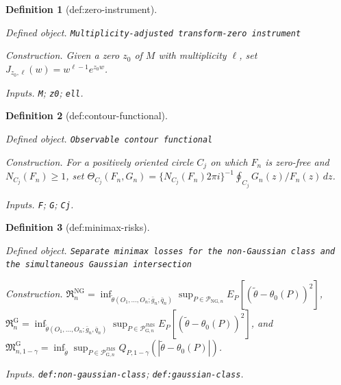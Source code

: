 \documentclass{article}
\newtheorem{definition}{Definition}
\begin{document}
\begin{definition}[def:zero-instrument]\label{def:zero-instrument}
\par\smallskip\noindent\emph{Defined object.} \texttt{Multiplicity-\allowbreak{}adjusted transform-\allowbreak{}zero instrument}
\par\smallskip\noindent\emph{Construction.} Given a zero \(z_0\) of \(M\) with multiplicity \(\ell\), set \(J_{z_0,\ell}(w)=w^{\ell-1}e^{z_0w}\).
\par\smallskip\noindent\emph{Inputs.} \texttt{M}; \texttt{z0}; \texttt{ell}.
\end{definition}

\begin{definition}[def:contour-functional]\label{def:contour-functional}
\par\smallskip\noindent\emph{Defined object.} \texttt{Observable contour functional}
\par\smallskip\noindent\emph{Construction.} For a positively oriented circle \(C_j\) on which \(F_n\) is zero-free and \(N_{C_j}(F_n)\ge1\), set \(\Theta_{C_j}(F_n,G_n)=\{N_{C_j}(F_n)2\pi i\}^{-1}\oint_{C_j}G_n(z)/F_n(z)\,dz\).
\par\smallskip\noindent\emph{Inputs.} \texttt{F}; \texttt{G}; \texttt{Cj}.
\end{definition}

\begin{definition}[def:minimax-risks]\label{def:minimax-risks}
\par\smallskip\noindent\emph{Defined object.} \texttt{Separate minimax losses for the non-\allowbreak{}Gaussian class and the simultaneous Gaussian intersection}
\par\smallskip\noindent\emph{Construction.} \(\mathfrak R_n^{\mathrm{NG}}=\inf_{\widetilde\theta(O_1,\ldots,O_n;\bar g_n,\bar q_n)}\sup_{P\in\mathcal P_{\mathrm{NG},n}}E_P[(\widetilde\theta-\theta_0(P))^2]\), \(\mathfrak R_n^{\mathrm G}=\inf_{\widetilde\theta(O_1,\ldots,O_n;\bar g_n,\bar q_n)}\sup_{P\in\mathcal P_{\mathrm G,n}^{\mathrm{JMS}}}E_P[(\widetilde\theta-\theta_0(P))^2]\), and \(\mathfrak M_{n,1-\gamma}^{\mathrm G}=\inf_{\widetilde\theta}\sup_{P\in\mathcal P_{\mathrm G,n}^{\mathrm{JMS}}}Q_{P,1-\gamma}(|\widetilde\theta-\theta_0(P)|)\).
\par\smallskip\noindent\emph{Inputs.} \texttt{def:\allowbreak{}non-\allowbreak{}gaussian-\allowbreak{}class}; \texttt{def:\allowbreak{}gaussian-\allowbreak{}class}.
\end{definition}
\end{document}
